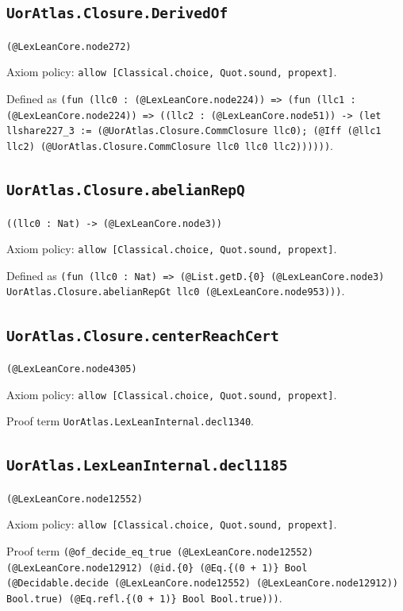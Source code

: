 \documentclass[11pt]{article}
\begin{document}
\subsection*{\texttt{UorAtlas.Closure.DerivedOf}}
\noindent\texttt{(@LexLeanCore.node272)}\par
\noindent Axiom policy: \texttt{allow [Classical.choice, Quot.sound, propext]}.\par
\noindent Defined as \texttt{(fun (llc0 : (@LexLeanCore.node224)) => (fun (llc1 : (@LexLeanCore.node224)) => ((llc2 : (@LexLeanCore.node51)) -> (let llshare227\_3 := (@UorAtlas.Closure.CommClosure llc0); (@Iff (@llc1 llc2) (@UorAtlas.Closure.CommClosure llc0 llc0 llc2))))))}.\par
\subsection*{\texttt{UorAtlas.Closure.abelianRepQ}}
\noindent\texttt{((llc0 : Nat) -> (@LexLeanCore.node3))}\par
\noindent Axiom policy: \texttt{allow [Classical.choice, Quot.sound, propext]}.\par
\noindent Defined as \texttt{(fun (llc0 : Nat) => (@List.getD.\{0\} (@LexLeanCore.node3) UorAtlas.Closure.abelianRepGt llc0 (@LexLeanCore.node953)))}.\par
\subsection*{\texttt{UorAtlas.Closure.centerReachCert}}
\noindent\texttt{(@LexLeanCore.node4305)}\par
\noindent Axiom policy: \texttt{allow [Classical.choice, Quot.sound, propext]}.\par
\noindent Proof term \texttt{UorAtlas.LexLeanInternal.decl1340}.\par
\subsection*{\texttt{UorAtlas.LexLeanInternal.decl1185}}
\noindent\texttt{(@LexLeanCore.node12552)}\par
\noindent Axiom policy: \texttt{allow [Classical.choice, Quot.sound, propext]}.\par
\noindent Proof term \texttt{(@of\_decide\_eq\_true (@LexLeanCore.node12552) (@LexLeanCore.node12912) (@id.\{0\} (@Eq.\{(0 + 1)\} Bool (@Decidable.decide (@LexLeanCore.node12552) (@LexLeanCore.node12912)) Bool.true) (@Eq.refl.\{(0 + 1)\} Bool Bool.true)))}.\par
\end{document}
